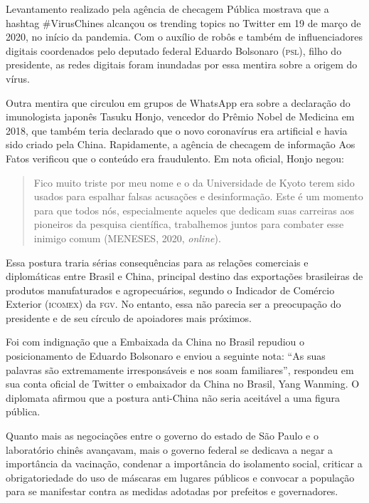 Levantamento realizado pela agência de checagem Pública mostrava que a
hashtag \#VirusChines alcançou os trending topics no Twitter em 19 de
março de 2020, no início da pandemia. Com o auxílio de robôs e também de
influenciadores digitais coordenados pelo deputado federal Eduardo
Bolsonaro (\textsc{psl}), filho do presidente, as redes digitais foram
inundadas por essa mentira sobre a origem do vírus.

Outra mentira que circulou em grupos de WhatsApp era sobre a declaração
do imunologista japonês Tasuku Honjo, vencedor do Prêmio Nobel de
Medicina em 2018, que também teria declarado que o novo coronavírus era
artificial e havia sido criado pela China. Rapidamente, a agência de
checagem de informação Aos Fatos verificou que o conteúdo era
fraudulento. Em nota oficial, Honjo negou:

\begin{quote}
Fico muito triste por meu nome e o da Universidade de Kyoto terem sido
usados ​​para espalhar falsas acusações e desinformação. Este é um
momento para que todos nós, especialmente aqueles que dedicam suas
carreiras aos pioneiros da pesquisa científica, trabalhemos juntos para
combater esse inimigo comum (MENESES, 2020, \textit{online}).
\end{quote}

Essa postura traria sérias consequências para as relações comerciais e
diplomáticas entre Brasil e China, principal destino das exportações
brasileiras de produtos manufaturados e agropecuários, segundo o
Indicador de Comércio Exterior (\textsc{icomex}) da \textsc{fgv}. No entanto, essa não parecia ser a preocupação do presidente e de
seu círculo de apoiadores mais próximos.

Foi com indignação que a Embaixada da China no Brasil repudiou o
posicionamento de Eduardo Bolsonaro e enviou a seguinte nota: ``As suas
palavras são extremamente irresponsáveis e nos soam familiares'',
respondeu em sua conta oficial de Twitter o embaixador da China no
Brasil, Yang Wanming. O diplomata afirmou que a postura anti-China não
seria aceitável a uma figura pública.

Quanto mais as negociações entre o governo do estado de São Paulo e o
laboratório chinês avançavam, mais o governo federal se dedicava a negar
a importância da vacinação, condenar a importância do isolamento social,
criticar a obrigatoriedade do uso de máscaras em lugares públicos e
convocar a população para se manifestar contra as medidas adotadas por
prefeitos e governadores.

